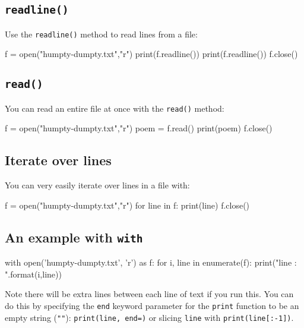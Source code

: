 \documentclass[12pt]{article} \newif\ifsolution\solutiontrue %
\begin{document}
\subsection{\texorpdfstring{\texttt{readline()}}{readline()}}\label{readline}

Use the \texttt{readline()} method to read lines from a file:

\begin{python}
f = open("humpty-dumpty.txt","r")
print(f.readline())
print(f.readline())
f.close()
\end{python}

\subsection{\texorpdfstring{\texttt{read()}}{read()}}\label{read}

You can read an entire file at once with the \texttt{read()} method:

\begin{python}
f = open("humpty-dumpty.txt","r")
poem = f.read()
print(poem)
f.close()
\end{python}

\subsection{Iterate over lines}\label{iterate-over-lines}

You can very easily iterate over lines in a file with:

\begin{python}
f = open("humpty-dumpty.txt","r")
for line in f:
    print(line)
f.close()
\end{python}

\subsection{\texorpdfstring{An example with
\texttt{with}}{An example with with}}\label{an-example-with-with}

\begin{python}
with open('humpty-dumpty.txt', 'r') as f:
    for i, line in enumerate(f):
        print("line {}: {}".format(i,line))
\end{python}

Note there will be extra lines between each line of text if you run this. You can do this by
specifying the \texttt{end} keyword parameter for the \texttt{print}
function to be an empty string (\texttt{""}):
\texttt{print(line,\ end=\textquotesingle{}\textquotesingle{})} or
slicing \texttt{line} with \texttt{print(line{[}:-1{]})}.
\end{document}
